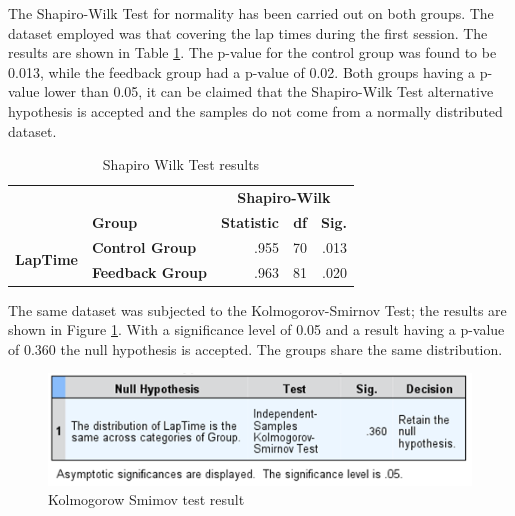 The Shapiro-Wilk Test for normality has been carried out on both groups. The dataset employed was that covering the lap times during the first session. The results are shown in Table \ref{table:shapiroWilk}. The p-value for the control group was found to be 0.013, while the feedback group had a p-value of 0.02. Both groups having a p-value lower than 0.05, it can be claimed that the Shapiro-Wilk Test alternative hypothesis is accepted and the samples do not come from a normally distributed dataset.

\begin{table}[]
	\centering
	\begin{tabular}{ll|rrr|}
		\cline{3-5}
		&                         & \multicolumn{3}{c|}{\textbf{Shapiro-Wilk}}                          \\ \cline{2-2}
		\multicolumn{1}{l|}{\textbf{}}                          & \textbf{Group}          & \textbf{Statistic}        & \textbf{df}             & \textbf{Sig.} \\ \hline
		\multicolumn{1}{|c|}{\multirow{2}{*}{\textbf{LapTime}}} & \textbf{Control Group}  & \multicolumn{1}{r|}{.955} & \multicolumn{1}{r|}{70} & .013          \\ \cline{2-5} 
		\multicolumn{1}{|c|}{}                                  & \textbf{Feedback Group} & \multicolumn{1}{r|}{.963} & \multicolumn{1}{r|}{81} & .020          \\ \hline
	\end{tabular}
	\caption[Shapiro Wilk Test results]{Shapiro Wilk Test results}
	\label{table:shapiroWilk}
\end{table}

The same dataset was subjected to the Kolmogorov-Smirnov Test; the results are shown in Figure \ref{fig:chart-KolmogorowSmimov}. With a significance level of 0.05 and a result having a p-value of 0.360 the null hypothesis is accepted. The groups share the same distribution.

\begin{figure}[!htb]
	\centering
	\includegraphics[width=\textwidth]{images/KolmogorowSmimov.png}
	\caption[Kolmogorow Smimov Test]{Kolmogorow Smimov test result}
	\label{fig:chart-KolmogorowSmimov}
\end{figure}

